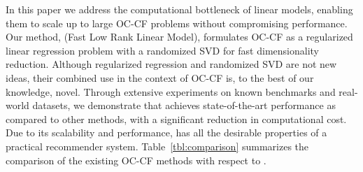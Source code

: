 In this paper we address the computational bottleneck of linear models, enabling them to scale up to large OC-CF problems without compromising performance. Our method, \LinearLow (Fast Low Rank Linear Model), formulates OC-CF as a regularized linear regression problem with a randomized SVD for fast dimensionality reduction. 
Although regularized regression and randomized SVD are not new ideas,  their combined use in the context of OC-CF is,  to the best of our knowledge, novel. 
Through extensive experiments on known benchmarks and real-world datasets, we demonstrate that \LinearLow achieves state-of-the-art performance as 
compared to other methods, with a significant reduction in computational cost.  Due to its scalability and performance, 
\LinearLow has all the desirable properties of a practical recommender system. Table~\ref{tbl:comparison} summarizes the comparison of the existing OC-CF methods with respect to \LinearLow.


